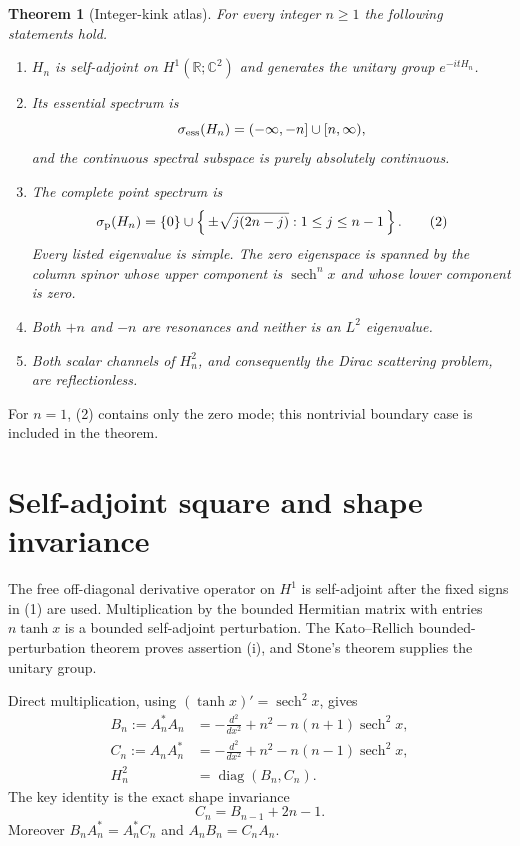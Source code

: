 \documentclass[10pt]{article}
\newtheorem{theorem}{Theorem}
\theoremstyle{remark}
\newcommand{\R}{\mathbb R}
\newcommand{\sech}{\operatorname{sech}}
\begin{document}
\begin{theorem}[Integer-kink atlas]\label{thm:main}
For every integer $n\geq1$ the following statements hold.
\begin{enumerate}[label=\textup{(\roman*)}]
\item $H_n$ is self-adjoint on $H^1(\R;\mathbb C^2)$ and generates the
unitary group $e^{-itH_n}$.
\item Its essential spectrum is
\[
 \sigma_{\rm ess}(H_n)=(-\infty,-n]\cup[n,\infty),
\]
and the continuous spectral subspace is purely absolutely continuous.
\item The complete point spectrum is
\[
 \sigma_{\rm p}(H_n)=\{0\}\cup
 \left\{\,\pm\sqrt{j(2n-j)}:1\leq j\leq n-1\,\right\}.   \tag{2}
\]
Every listed eigenvalue is simple.  The zero eigenspace is spanned by the
column spinor whose upper component is $\sech^n x$ and whose lower
component is zero.
\item Both $+n$ and $-n$ are resonances and neither is an $L^2$
eigenvalue.
\item Both scalar channels of $H_n^2$, and consequently the Dirac
scattering problem, are reflectionless.
\end{enumerate}
\end{theorem}

For $n=1$, (2) contains only the zero mode; this nontrivial boundary case
is included in the theorem.

\section{Self-adjoint square and shape invariance}

The free off-diagonal derivative operator on $H^1$ is self-adjoint after
the fixed signs in (1) are used.  Multiplication by the bounded Hermitian
matrix with entries $n\tanh x$ is a bounded self-adjoint perturbation.
The Kato--Rellich bounded-perturbation theorem proves assertion (i), and
Stone's theorem supplies the unitary group.

Direct multiplication, using $(\tanh x)'=\sech^2x$, gives
\begin{equation}
\begin{aligned}
 B_n:=A_n^*A_n
  &=-\frac{d^2}{dx^2}+n^2-n(n+1)\sech^2x,\\
 C_n:=A_nA_n^*
  &=-\frac{d^2}{dx^2}+n^2-n(n-1)\sech^2x,\\
 H_n^2&=\operatorname{diag}(B_n,C_n).
\end{aligned}                                                   \tag{3}
\end{equation}
The key identity is the exact shape invariance
\begin{equation}
 C_n=B_{n-1}+2n-1.                                      \tag{4}
\end{equation}
Moreover $B_nA_n^*=A_n^*C_n$ and $A_nB_n=C_nA_n$.
\end{document}
